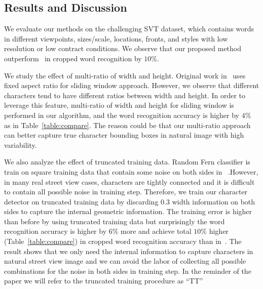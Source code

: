 \documentclass[10pt,twocolumn,letterpaper]{article}
\begin{document}
\subsection{Results and Discussion}

We evaluate our methods on the challenging SVT dataset, which contains words in different viewpoints, sizes/scale, locations, fronts, and styles with low resolution or low contract conditions. We observe that our proposed method outperform~\cite{117} in cropped word recognition by $10\%$.

We study the effect of multi-ratio of width and height. Original work in~\cite{417} uses fixed aspect ratio for sliding window approach. However, we observe that different characters tend to have different ratios between width and height. In order to leverage this feature, multi-ratio of width and height for sliding window is performed in our algorithm, and the word recognition accuracy is higher by $4\%$ as in Table~\ref{table:compare}. The reason could be that our multi-ratio approach can better capture true character bounding boxes in natural image with high variability.

We also analyze the effect of truncated training data. Random Fern classifier is train on square training data that contain some noise on both sides in~\cite{417} .However, in many real street view cases, characters are tightly connected and it is difficult to contain all possible noise in training step. Therefore, we train our character detector on truncated training data by discarding $0.3$ width information on both sides to capture the internal geometric information. The training error is higher than before by using truncated training data but surprisingly the word recognition accuracy is higher by $6\%$ more and achieve total $10\%$ higher (Table~\ref{table:compare}) in cropped word recognition accuracy than in~\cite{417}. The result shows that we only need the internal information to capture characters in natural street view image and we can avoid the labor of collecting all possible combinations for the noise in both sides in training step. In the reminder of the paper we will refer to the truncated training procedure as ``TT''
\end{document}
